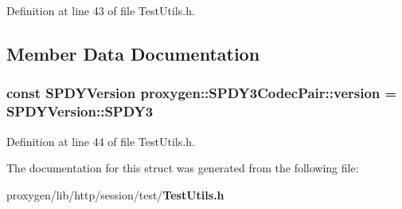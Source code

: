 Definition at line 43 of file Test\+Utils.\+h.



\subsection{Member Data Documentation}
\subsubsection[{version}]{\setlength{\rightskip}{0pt plus 5cm}const {\bf S\+P\+D\+Y\+Version} proxygen\+::\+S\+P\+D\+Y3\+Codec\+Pair\+::version = {\bf S\+P\+D\+Y\+Version\+::\+S\+P\+D\+Y3}\hspace{0.3cm}{\ttfamily [static]}}\label{structproxygen_1_1SPDY3CodecPair_a9533ecd1eaeafe057902fc4a0484f8a4}


Definition at line 44 of file Test\+Utils.\+h.



The documentation for this struct was generated from the following file\+:\begin{DoxyCompactItemize}
\item 
proxygen/lib/http/session/test/{\bf Test\+Utils.\+h}\end{DoxyCompactItemize}

